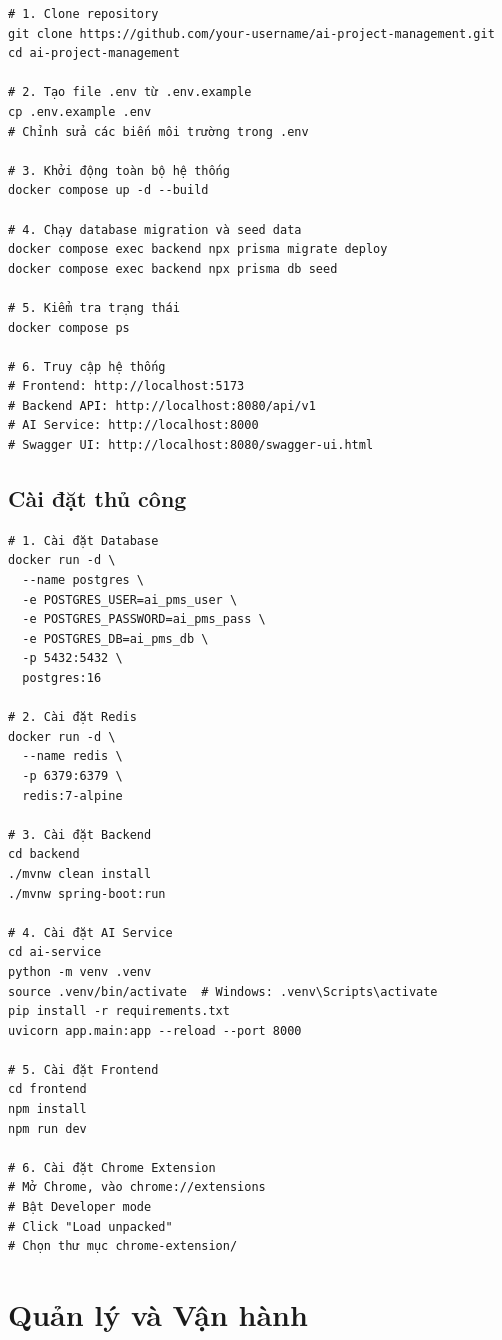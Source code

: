 \documentclass[12pt,a4paper]{report}
\begin{document}
\begin{verbatim}
# 1. Clone repository
git clone https://github.com/your-username/ai-project-management.git
cd ai-project-management

# 2. Tạo file .env từ .env.example
cp .env.example .env
# Chỉnh sửa các biến môi trường trong .env

# 3. Khởi động toàn bộ hệ thống
docker compose up -d --build

# 4. Chạy database migration và seed data
docker compose exec backend npx prisma migrate deploy
docker compose exec backend npx prisma db seed

# 5. Kiểm tra trạng thái
docker compose ps

# 6. Truy cập hệ thống
# Frontend: http://localhost:5173
# Backend API: http://localhost:8080/api/v1
# AI Service: http://localhost:8000
# Swagger UI: http://localhost:8080/swagger-ui.html
\end{verbatim}

\subsection{Cài đặt thủ công}

\begin{verbatim}
# 1. Cài đặt Database
docker run -d \
  --name postgres \
  -e POSTGRES_USER=ai_pms_user \
  -e POSTGRES_PASSWORD=ai_pms_pass \
  -e POSTGRES_DB=ai_pms_db \
  -p 5432:5432 \
  postgres:16

# 2. Cài đặt Redis
docker run -d \
  --name redis \
  -p 6379:6379 \
  redis:7-alpine

# 3. Cài đặt Backend
cd backend
./mvnw clean install
./mvnw spring-boot:run

# 4. Cài đặt AI Service
cd ai-service
python -m venv .venv
source .venv/bin/activate  # Windows: .venv\Scripts\activate
pip install -r requirements.txt
uvicorn app.main:app --reload --port 8000

# 5. Cài đặt Frontend
cd frontend
npm install
npm run dev

# 6. Cài đặt Chrome Extension
# Mở Chrome, vào chrome://extensions
# Bật Developer mode
# Click "Load unpacked"
# Chọn thư mục chrome-extension/
\end{verbatim}

\section{Quản lý và Vận hành}
\end{document}
